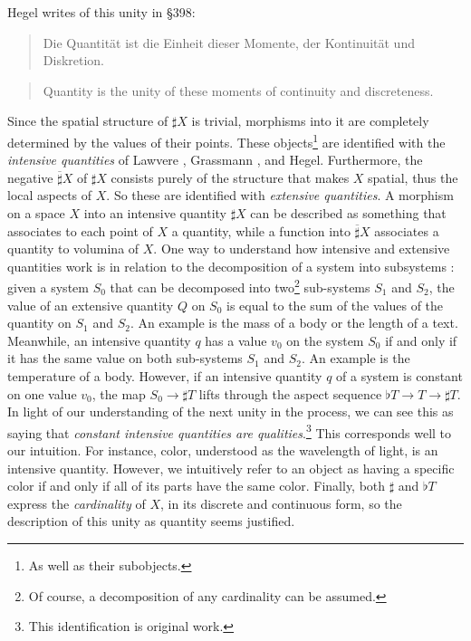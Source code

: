 \documentclass{article}
\begin{document}
Hegel writes of this unity in §398:

\begin{quote}
    Die Quantität ist die Einheit dieser Momente, der Kontinuität und Diskretion.
\end{quote}

\begin{quote}
    Quantity is the unity of these moments of continuity and discreteness.
\end{quote}

Since the spatial structure of $\sharp X$ is trivial, morphisms into it are completely determined by the 
values of their points. These objects\footnote{As well as their subobjects.} are identified with the 
\emph{intensive quantities} of Lawvere \cite{Law82}, Grassmann \cite{Grass}, and Hegel. Furthermore, the 
negative $\overline{\sharp} X$ of $\sharp X$ consists purely of the structure that makes $X$ spatial, thus 
the local aspects of $X$. So these are identified with \emph{extensive quantities}. A morphism on a space $X$
into an intensive quantity $\sharp X$ can be described as something that associates to each point of $X$ a
quantity, while a function into $\overline{\sharp} X$ associates a quantity to volumina of $X$. One way to 
understand how intensive and extensive quantities work is in relation to the decomposition of a system into
subsystems \cite{nlabie}: given a system $S_0$ that can be decomposed into two\footnote{Of course, a
decomposition of any cardinality can be assumed.} sub-systems $S_1$ and $S_2$, the value of an extensive
quantity $Q$ on $S_0$ is equal to the sum of the values of the quantity on $S_1$ and $S_2$. An example is the
mass of a body or the length of a text. Meanwhile, an intensive quantity $q$ has a value $v_0$ on the system
$S_0$ if and only if it has the same value on both sub-systems $S_1$ and $S_2$. An example is the temperature
of a body. However, if an intensive quantity $q$ of a system is constant on one value $v_0$, the map 
$S_0\rightarrow\sharp T$ lifts through the aspect sequence $\flat T\rightarrow T\rightarrow\sharp T$. In
light of our understanding of the next unity in the process, we can see this as saying that \emph{constant
intensive quantities are qualities}.\footnote{This identification is original work.} This corresponds well to
our intuition. For instance, color, understood as the wavelength of light, is an intensive quantity. However,
we intuitively refer to an object as having a specific color if and only if all of its parts have the same 
color. Finally, both $\sharp$ and $\flat T$ express the \emph{cardinality} of $X$, in its discrete and
continuous form, so the description of this unity as quantity seems justified. \\
\end{document}
